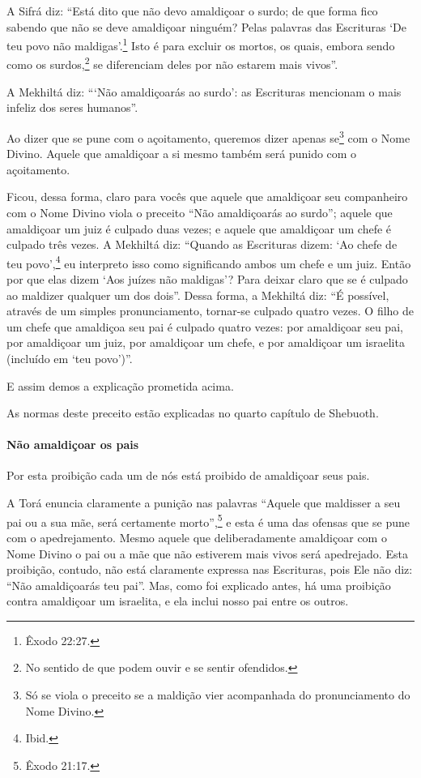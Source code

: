 A Sifrá diz: ``Está dito que não devo amaldiçoar o surdo; de que forma
fico sabendo que não se deve amaldiçoar ninguém? Pelas palavras das
Escrituras `De teu povo não maldigas'.\footnote{Êxodo 22:27.} Isto é para
excluir os mortos, os quais, embora sendo como os
surdos,\footnote{No sentido de que podem ouvir e se sentir ofendidos.} se diferenciam deles por não estarem mais
vivos''.

A Mekhiltá diz: ```Não amaldiçoarás ao surdo': as Escrituras mencionam
o mais infeliz dos seres humanos''.

Ao dizer que se pune com o açoitamento, queremos dizer apenas se\footnote{Só se viola o preceito se a maldição vier acompanhada do
pronunciamento do Nome Divino.} com o Nome Divino. Aquele que amaldiçoar a si
mesmo também será punido com o açoitamento.

Ficou, dessa forma, claro para vocês que aquele que amaldiçoar seu
companheiro com o Nome Divino viola o preceito ``Não amaldiçoarás ao
surdo''; aquele que amaldiçoar um juiz é culpado duas vezes; e aquele
que amaldiçoar um chefe é culpado três vezes. A Mekhiltá diz: ``Quando
as Escrituras dizem: `Ao chefe de teu povo',\footnote{Ibid.} eu interpreto isso
como significando ambos um chefe e um juiz. Então por que elas dizem
`Aos juízes não maldigas'? Para deixar claro que se é culpado ao
maldizer qualquer um dos dois''. Dessa forma, a Mekhiltá diz: ``É
possível, através de um simples pronunciamento, tornar-se culpado
quatro vezes. O filho de um chefe que amaldiçoa seu pai é culpado quatro
vezes: por amaldiçoar seu pai, por amaldiçoar um juiz, por amaldiçoar um
chefe, e por amaldiçoar um israelita (incluído em `teu povo')''.

E assim demos a explicação prometida acima.

As normas deste preceito estão explicadas no quarto capítulo de Shebuoth.

\paragraph{Não amaldiçoar os pais}

Por esta proibição cada um de nós está proibido de amaldiçoar seus pais.

A Torá enuncia claramente a punição nas palavras ``Aquele que maldisser
a seu pai ou a sua mãe, será certamente morto'',\footnote{Êxodo 21:17.} e esta é
uma das ofensas que se pune com o apedrejamento. Mesmo aquele que
deliberadamente amaldiçoar com o Nome Divino o pai ou a mãe que não
estiverem mais vivos será apedrejado. Esta proibição, contudo, não está
claramente expressa nas Escrituras, pois Ele não diz: ``Não amaldiçoarás
teu pai''. Mas, como foi explicado antes, há uma proibição contra
amaldiçoar um israelita, e ela inclui nosso pai entre os outros.


